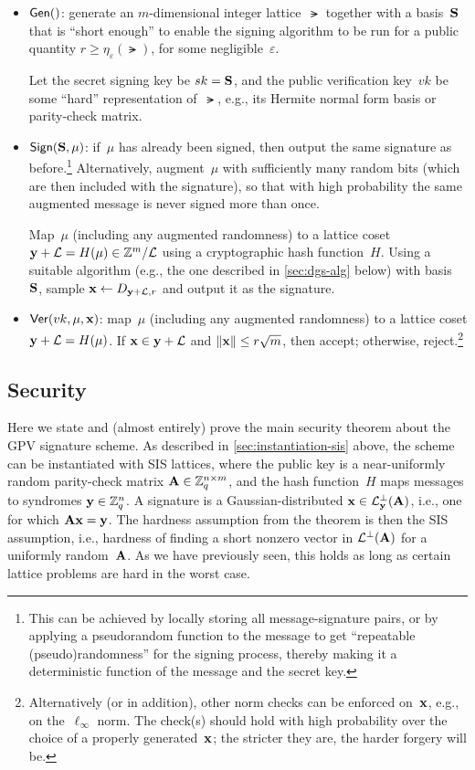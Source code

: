 \documentclass[11pt]{article}
\begin{document}
\begin{itemize}
\item $\mathsf{Gen}()$: generate an $m$-dimensional integer lattice~$\lat$
  together with a basis~$\mathbf{S}$ that is ``short enough'' to enable the
  signing algorithm to be run for a public quantity
  $r \geq \eta_{\varepsilon}(\lat)$, for some
  negligible~$\varepsilon$.

  Let the secret signing key be $sk = \mathbf{S}$, and the public
  verification key~$vk$ be some ``hard'' representation of~$\lat$,
  e.g., its Hermite normal form basis or parity-check matrix.

\item $\mathsf{Sign}(\mathbf{S}, \mu)$: if~$\mu$ has already been signed, then
  output the same signature as before.\footnote{This can be achieved
    by locally storing all message-signature pairs, or by applying a
    pseudorandom function to the message to get ``repeatable
    (pseudo)randomness'' for the signing process, thereby making it a
    deterministic function of the message and the secret key.}
  Alternatively, augment~$\mu$ with sufficiently many random bits
  (which are then included with the signature), so that with high
  probability the same augmented message is never signed more than
  once.

  Map~$\mu$ (including any augmented randomness) to a lattice coset
  $\mathbf{y}+\mathcal{L} = H(\mu) \in \mathbb{Z}^{m}/\mathcal{L}$ using a cryptographic hash
  function~$H$. Using a suitable algorithm (e.g., the one described in
  \cref{sec:dgs-alg} below) with basis~$\mathbf{S}$, sample
  $\mathbf{x} \gets D_{\mathbf{y}+\mathcal{L},r}$ and output it as the signature.

\item $\mathsf{Ver}(vk, \mu, \mathbf{x})$: map~$\mu$ (including any augmented
  randomness) to a lattice coset $\mathbf{y}+\mathcal{L} = H(\mu)$. If
  $\mathbf{x} \in \mathbf{y}+\mathcal{L}$ and $\lVert\mathbf{x}\rVert \leq r \sqrt{m}$, then
  accept; otherwise, reject.\footnote{Alternatively (or in addition),
    other norm checks can be enforced on~$\mathbf{x}$, e.g., on
    the~$\ell_{\infty}$ norm. The check(s) should hold with high
    probability over the choice of a properly generated~$\mathbf{x}$; the
    stricter they are, the harder forgery will be.}
\end{itemize}

\subsection{Security}
\label{sec:security}

Here we state and (almost entirely) prove the main security theorem
about the GPV signature scheme. As described in
\cref{sec:instantiation-sis} above, the scheme can be instantiated
with SIS lattices, where the public key is a near-uniformly random
parity-check matrix $\mathbf{A} \in \mathbb{Z}_q^{n \times m}$, and the hash
function~$H$ maps messages to syndromes $\mathbf{y} \in \mathbb{Z}_q^{n}$. A
signature is a Gaussian-distributed
$\mathbf{x} \in \mathcal{L}^{\perp}_{\mathbf{y}}(\mathbf{A})$, i.e., one for which
$\mathbf{A} \mathbf{x} = \mathbf{y}$. The hardness assumption from the theorem is
then the SIS assumption, i.e., hardness of finding a short nonzero
vector in $\mathcal{L}^{\perp}(\mathbf{A})$ for a uniformly random~$\mathbf{A}$. As we have
previously seen, this holds as long as certain lattice problems are
hard in the worst case.
\end{document}
